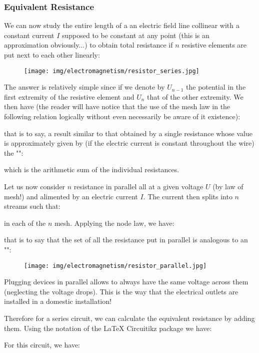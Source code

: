 	\pagebreak
	\subsubsection{Equivalent Resistance}
	We can now study the entire length of a an electric field line collinear with a constant current $I$ supposed to be constant at any point (this is an approximation obviously...) to obtain total resistance if $n$ resistive elements are put  next to each other linearly:
	\begin{figure}[H]
		\centering
		\texttt{[image: img/electromagnetism/resistor\_series.jpg]}
	\end{figure}
	
	The answer is relatively simple since if we denote by $U_{n-1}$ the potential in the first extremity of the resistive element and $U_n$ that of the other extremity. We then have (the reader will have notice that the use of the mesh law in the following relation logically without even necessarily be aware of it existence):
	
	that is to say, a result similar to that obtained by a single resistance whose value is approximately given by (if the electric current is constant throughout the wire) the "":
	
	which is the arithmetic sum of the individual resistances.

	Let us now consider $n$ resistance in parallel all at a given voltage $U$ (by law of mesh!) and alimented by an electric current $I$. The current then splits into $n$ streams such that:
	
	in each of the $n$ mesh. Applying the node law, we have:
	
	that is to say that the set of all the resistance put in parallel is analogous to an "":
	
	\begin{figure}[H]
		\centering
		\texttt{[image: img/electromagnetism/resistor\_parallel.jpg]}
	\end{figure}
	Plugging devices in parallel allows to always have the same voltage across them (neglecting the voltage drops). This is the way that the electrical outlets are installed in a domestic installation!
	
	 Therefore for a series circuit, we can calculate the equivalent resistance by adding them. Using the notation of the \LaTeX{} Circuitikz package we have:
    \begin{center}
    \end{center}
    For this circuit, we have:
    
